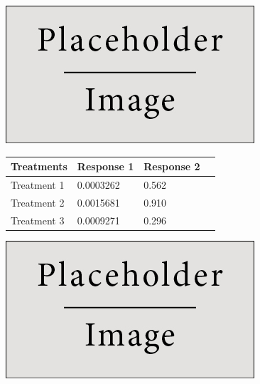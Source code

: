 \documentclass[a0,portrait]{a0poster}
\begin{document}
\begin{multicols}{2}
\begin{center}\vspace{1cm}
\includegraphics[width=0.8\linewidth]{placeholder}
\end{center}\vspace{1cm}

\blindtext

\begin{center}\vspace{1cm}
\begin{tabular}{l l l l}
\toprule
\textbf{Treatments} & \textbf{Response 1} & \textbf{Response 2} \\
\midrule
Treatment 1 & 0.0003262 & 0.562 \\
Treatment 2 & 0.0015681 & 0.910 \\
Treatment 3 & 0.0009271 & 0.296 \\
\bottomrule
\end{tabular}
\end{center}\vspace{1cm}


\begin{center}\vspace{1cm}
\includegraphics[width=0.8\linewidth]{placeholder}
\end{center}\vspace{1cm}


\end{multicols}
\end{document}
